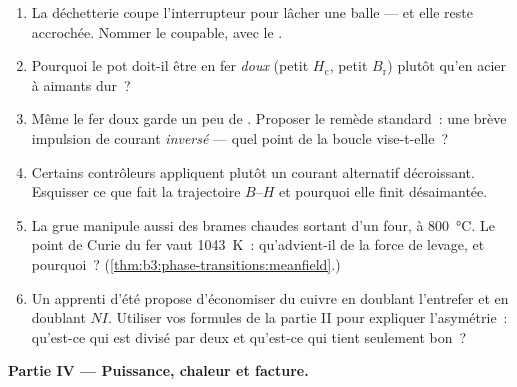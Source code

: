 \begin{problem}
\begin{enumerate}[resume]
  \item La déchetterie coupe l'interrupteur pour lâcher une balle
        --- et elle reste accrochée. Nommer le coupable, avec le
        .
  \item Pourquoi le pot doit-il être en fer \emph{doux} (petit
        $H_{\text{c}}$, petit $B_{\text{r}}$) plutôt qu'en acier
        à aimants dur~?
  \item Même le fer doux garde un peu de . Proposer le
        remède standard~: une brève impulsion de courant
        \emph{inversé} --- quel point de la boucle vise-t-elle~?
  \item Certains contrôleurs appliquent plutôt un courant
        alternatif décroissant. Esquisser ce que fait la
        trajectoire $B$--$H$ et pourquoi elle finit désaimantée.
  \item La grue manipule aussi des brames chaudes sortant d'un
        four, à \qty{800}{\celsius}. Le point de Curie du fer vaut
        \qty{1043}{K}~: qu'advient-il de la force de levage, et
        pourquoi~? (\cref{thm:b3:phase-transitions:meanfield}.)
  \item Un apprenti d'été propose d'économiser du cuivre en
        doublant l'entrefer et en doublant $NI$. Utiliser vos
        formules de la partie II pour expliquer l'asymétrie~:
        qu'est-ce qui est divisé par deux et qu'est-ce qui tient
        seulement bon~?
\end{enumerate}

\medskip\noindent\textbf{Partie IV --- Puissance, chaleur et facture.}


\end{problem}
